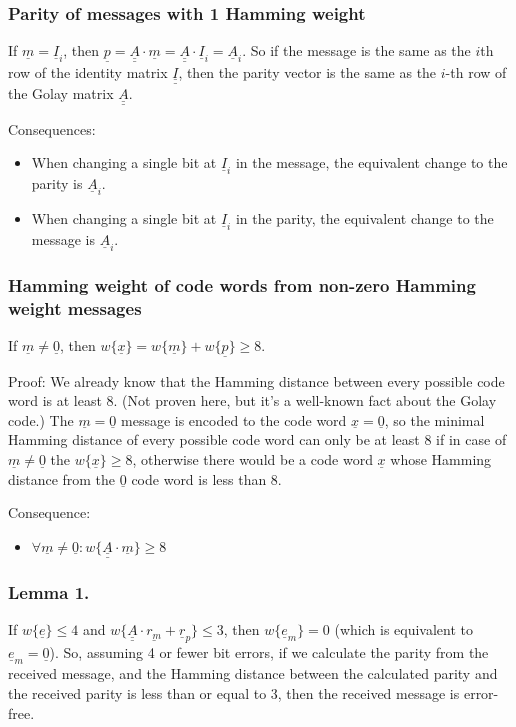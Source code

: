\documentclass[11pt,a4paper,oneside]{report}             %
\def\doubleunderline#1{\underline{\underline{#1}}}
\def\dul#1{\doubleunderline{#1}}
\def\ul#1{\underline{#1}}
\begin{document}
\subsubsection{Parity of messages with 1 Hamming weight}

If $\ul{m} = \ul{I}_{i}$, then $\ul{p} = \dul{A} \cdot \ul{m} = \dul{A} \cdot \ul{I}_{i} = \ul{A}_{i}$.
So if the message is the same as the $i$th row of the identity matrix $\dul{I}$, then the parity vector is the
same as the $i$-th row of the Golay matrix $\dul{A}$.

Consequences:
\begin{itemize}
    \item When changing a single bit at $\ul{I}_{i}$ in the message, the equivalent change to the parity is $\ul{A}_{i}$.
    \item When changing a single bit at $\ul{I}_{i}$ in the parity, the equivalent change to the message is $\ul{A}_{i}$.
\end{itemize}

\subsubsection{Hamming weight of code words from non-zero Hamming weight messages}

If $\ul{m} \neq \ul{0}$, then $w\{ \ul{x} \} = w\{ \ul{m} \} + w\{ \ul{p} \} \geq 8$.

Proof:
We already know that the Hamming distance between every possible code word is at least 8.
(Not proven here, but it's a well-known fact about the Golay code.)
The $\ul{m} = \ul{0}$ message is encoded to the code word $\ul{x} = \ul{0}$, so
the minimal Hamming distance of every possible code word can only be at least 8 if
in case of $\ul{m} \neq \ul{0}$ the $w\{ \ul{x} \} \geq 8$, otherwise there
would be a code word $\ul{x}$ whose Hamming distance from the $\ul{0}$ code word is less than 8.

Consequence:
\begin{itemize}
    \item $\forall \ul{m} \neq \ul{0} : w\{ \dul{A} \cdot \ul{m} \} \geq 8$
\end{itemize}

\subsubsection{Lemma 1.}

If $w\{\ul{e}\} \leq 4$ and $w\{\dul{A} \cdot \ul {r_m} + \ul{r}_p\} \leq 3$,
then $w\{\ul{e}_m\} = 0$ (which is equivalent to $\ul{e}_m = \ul{0}$).
So, assuming 4 or fewer bit errors, if we calculate the parity from the received message, and
the Hamming distance between the calculated parity and the received parity is less than
or equal to 3, then the received message is error-free.
\end{document}
